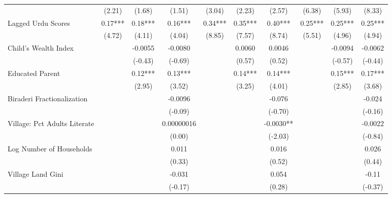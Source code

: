 \begin{sidewaystable}[htbp]
\begin{tabular}{l*{9}{c}}
                &   (2.21)   &   (1.68)   &   (1.51)   &   (3.04)   &   (2.23)   &   (2.57)   &   (6.38)   &   (5.93)   &   (8.33)   \\
Lagged Urdu Scores&     0.17***&     0.18***&     0.16***&     0.34***&     0.35***&     0.40***&     0.25***&     0.25***&     0.25***\\
                &   (4.72)   &   (4.11)   &   (4.04)   &   (8.85)   &   (7.57)   &   (8.74)   &   (5.51)   &   (4.96)   &   (4.94)   \\
Child's Wealth Index&            &  -0.0055   &  -0.0080   &            &   0.0060   &   0.0046   &            &  -0.0094   &  -0.0062   \\
                &            &  (-0.43)   &  (-0.69)   &            &   (0.57)   &   (0.52)   &            &  (-0.57)   &  (-0.44)   \\
Educated Parent &            &     0.12***&     0.13***&            &     0.14***&     0.14***&            &     0.15***&     0.17***\\
                &            &   (2.95)   &   (3.52)   &            &   (3.25)   &   (4.01)   &            &   (2.85)   &   (3.68)   \\
Biraderi Fractionalization&            &            &  -0.0096   &            &            &   -0.076   &            &            &   -0.024   \\
                &            &            &  (-0.09)   &            &            &  (-0.70)   &            &            &  (-0.16)   \\
Village: Pct Adults Literate&            &            &0.00000016   &            &            &  -0.0030** &            &            &  -0.0022   \\
                &            &            &   (0.00)   &            &            &  (-2.03)   &            &            &  (-0.84)   \\
Log Number of Households&            &            &    0.011   &            &            &    0.016   &            &            &    0.026   \\
                &            &            &   (0.33)   &            &            &   (0.52)   &            &            &   (0.44)   \\
Village Land Gini&            &            &   -0.031   &            &            &    0.054   &            &            &    -0.11   \\
                &            &            &  (-0.17)   &            &            &   (0.28)   &            &            &  (-0.37)   \\

\end{tabular}
\end{sidewaystable}

